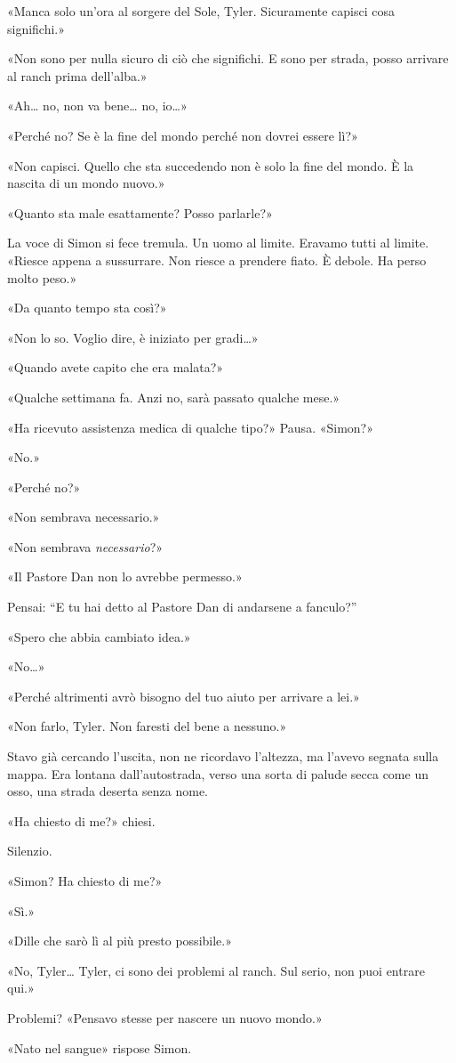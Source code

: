 «Manca solo un'ora al sorgere del Sole, Tyler. Sicuramente capisci cosa
significhi.»

«Non sono per nulla sicuro di ciò che significhi. E sono per strada,
posso arrivare al ranch prima dell'alba.»

«Ah\ldots{} no, non va bene\ldots{} no, io\ldots»

«Perché no? Se è la fine del mondo perché non dovrei essere lì?»

«Non capisci. Quello che sta succedendo non è solo la fine del mondo. È
la nascita di un mondo nuovo.»

«Quanto sta male esattamente? Posso parlarle?»

La voce di Simon si fece tremula. Un uomo al limite. Eravamo tutti al
limite. «Riesce appena a sussurrare. Non riesce a prendere fiato. È
debole. Ha perso molto peso.»

«Da quanto tempo sta così?»

«Non lo so. Voglio dire, è iniziato per gradi\ldots»

«Quando avete capito che era malata?»

«Qualche settimana fa. Anzi no, sarà passato qualche mese.»

«Ha ricevuto assistenza medica di qualche tipo?» Pausa. «Simon?»

«No.»

«Perché no?»

«Non sembrava necessario.»

«Non sembrava \emph{necessario}?»

«Il Pastore Dan non lo avrebbe permesso.»

Pensai: ``E tu hai detto al Pastore Dan di andarsene a fanculo?''

«Spero che abbia cambiato idea.»

«No\ldots»

«Perché altrimenti avrò bisogno del tuo aiuto per arrivare a lei.»

«Non farlo, Tyler. Non faresti del bene a nessuno.»

Stavo già cercando l'uscita, non ne ricordavo l'altezza, ma l'avevo
segnata sulla mappa. Era lontana dall'autostrada, verso una sorta di
palude secca come un osso, una strada deserta senza nome.

«Ha chiesto di me?» chiesi.

Silenzio.

«Simon? Ha chiesto di me?»

«Sì.»

«Dille che sarò lì al più presto possibile.»

«No, Tyler\ldots{} Tyler, ci sono dei problemi al ranch. Sul serio, non
puoi entrare qui.»

Problemi? «Pensavo stesse per nascere un nuovo mondo.»

«Nato nel sangue» rispose Simon.